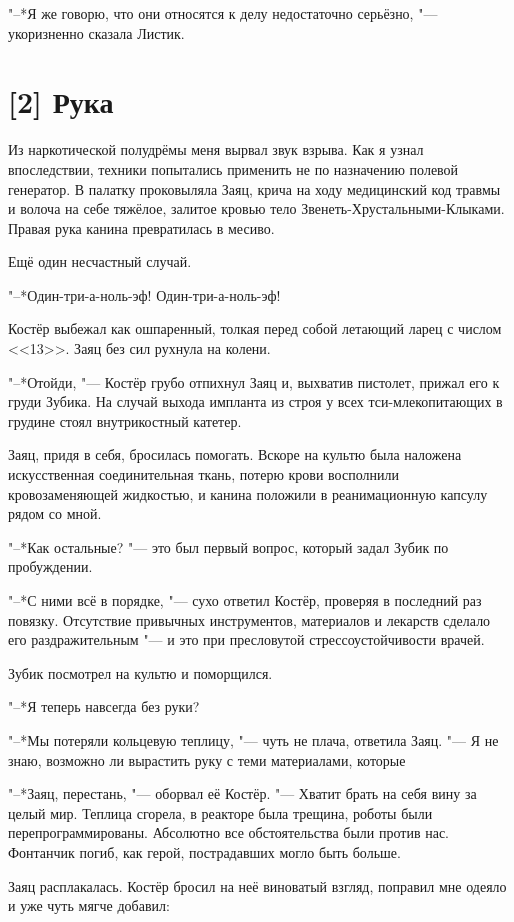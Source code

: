 "--*Я же говорю, что они относятся к делу недостаточно серьёзно, "--- укоризненно сказала Листик.

\section{[2] Рука}

Из наркотической полудрёмы меня вырвал звук взрыва.
Как я узнал впоследствии, техники попытались применить не по назначению полевой генератор.
В палатку проковыляла Заяц, крича на ходу медицинский код травмы и волоча на себе тяжёлое, залитое кровью тело Звенеть-Хрустальными-Клыками.
Правая рука канина превратилась в месиво.

Ещё один несчастный случай.

"--*Один-три-а-ноль-эф!
Один-три-а-ноль-эф!

Костёр выбежал как ошпаренный, толкая перед собой летающий ларец с числом <<13>>.
Заяц без сил рухнула на колени.

"--*Отойди, "--- Костёр грубо отпихнул Заяц и, выхватив пистолет, прижал его к груди Зубика.
На случай выхода импланта из строя у всех тси-млекопитающих в грудине стоял внутрикостный катетер.

Заяц, придя в себя, бросилась помогать.
Вскоре на культю была наложена искусственная соединительная ткань, потерю крови восполнили кровозаменяющей жидкостью, и канина положили в реанимационную капсулу рядом со мной.

"--*Как остальные? "--- это был первый вопрос, который задал Зубик по пробуждении.

"--*С ними всё в порядке, "--- сухо ответил Костёр, проверяя в последний раз повязку.
Отсутствие привычных инструментов, материалов и лекарств сделало его раздражительным "--- и это при пресловутой стрессоустойчивости врачей.

Зубик посмотрел на культю и поморщился.

"--*Я теперь навсегда без руки?

"--*Мы потеряли кольцевую теплицу, "--- чуть не плача, ответила Заяц.
"--- Я не знаю, возможно ли вырастить руку с теми материалами, которые\ldotst

"--*Заяц, перестань, "--- оборвал её Костёр.
"--- Хватит брать на себя вину за целый мир.
Теплица сгорела, в реакторе была трещина, роботы были перепрограммированы.
Абсолютно все обстоятельства были против нас.
Фонтанчик погиб, как герой, пострадавших могло быть больше.

Заяц расплакалась.
Костёр бросил на неё виноватый взгляд, поправил мне одеяло и уже чуть мягче добавил:

